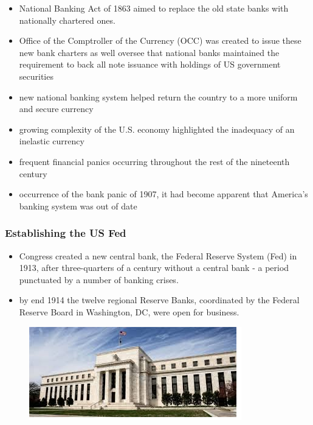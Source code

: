 \documentclass[11pt]{beamer}
\begin{document}
\begin{frame}
\begin{itemize}
\item National Banking Act of 1863 aimed to replace the old state banks with nationally chartered ones.
\item Office of the Comptroller of the Currency (OCC) was created to issue these new bank charters as well oversee that national banks maintained the requirement to back all note issuance with holdings of US government securities
\item new national banking system helped return the country to a more uniform and secure currency
\item growing complexity of the U.S. economy highlighted the inadequacy of an inelastic currency
\item frequent financial panics occurring throughout the rest of the nineteenth century
\item occurrence of the bank panic of 1907, it had become apparent that America’s banking system was out of date





\end{itemize}
\end{frame}


\begin{frame}
\frametitle{Establishing the US Fed}

\begin{itemize}
\item  Congress created a new central bank, the Federal Reserve System (Fed) in 1913, after three-quarters of a century without a central bank - a period punctuated by a number of banking crises.
\item by end 1914 the twelve regional Reserve Banks, coordinated by the Federal Reserve Board in Washington, DC, were open for business.
\end{itemize}
\begin{figure}
\includegraphics[]{Figures/Fed.png}
\end{figure}
\end{frame}
\end{document}
